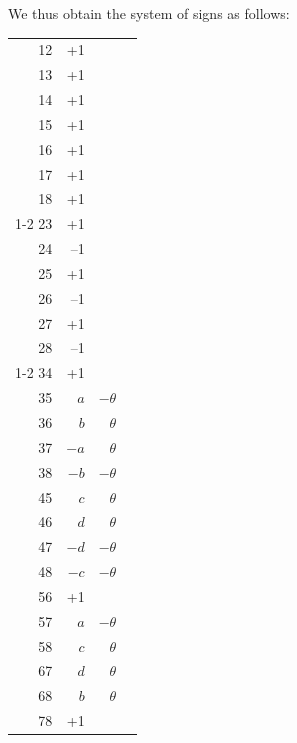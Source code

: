 \documentclass[11pt,a4paper,english]{article}
\theoremstyle{plain}
\begin{document}
We thus obtain the system of signs as follows:

\begin{center}
\begin{tabular}{r @{\quad} r @{\quad} r | r}
12 & +1 & & \\
13 & +1 & & \\
14 & +1 & & \\
15 & +1 & & \\
16 & +1 & & \\
17 & +1 & & \\
18 & +1 & & \\ \cline{1-2}
23 & +1 & & \\
24 & --1 & & \\
25 & +1 & & \\
26 & --1 & & \\
27 & +1 & & \\
28 & --1 & & \\ \cline{1-2}
34 & +1 & & \\
35 & $a$ & $-\theta$ & \\
36 & $b$ & $\theta$ & \\
37 & $-a$ & $\theta$ & \\
38 & $-b$ & $-\theta$ & \\
45 & $c$ & $\theta$ & \\
46 & $d$ & $\theta$ & \\
47 & $-d$ & $-\theta$ & \\
48 & $-c$ & $-\theta$ & \\
56 & +1 & & \\
57 & $a$ & $-\theta$ & \\
58 & $c$ & $\theta$ & \\
67 & $d$ & $\theta$ & \\
68 & $b$ & $\theta$ & \\
78 & +1 & & \\
\end{tabular}
\end{center}
\end{document}
